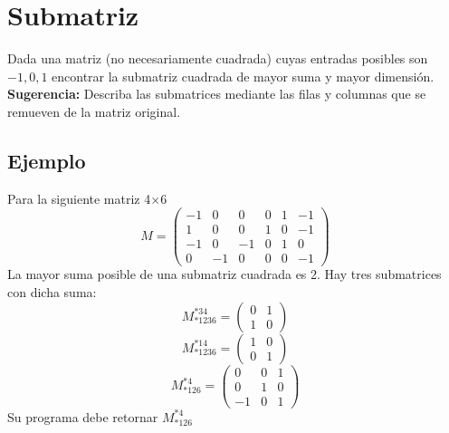 \section{Submatriz}
Dada una matriz (no necesariamente cuadrada) cuyas entradas posibles son $-1, 0, 1$
encontrar la submatriz cuadrada de mayor suma y mayor dimensión.
\textbf{Sugerencia:} Describa las submatrices mediante las filas y columnas que se
remueven de la matriz original.
\subsection*{Ejemplo}
Para la siguiente matriz 4$\times$6
\[
	M=
	\left(
		\begin{array}{rrrrrr}
			-1 & 0 & 0 & 0 & 1 & -1 \\
			1 & 0 & 0 & 1 & 0 & -1 \\
			-1 & 0 & -1 & 0 & 1 & 0 \\
			0 & -1 & 0 & 0 & 0 & -1
		\end{array}
	\right)
\]
La mayor suma posible de una submatriz cuadrada es 2. Hay tres submatrices con
dicha suma:
\[
	M^{*34}_{*1236}=
	\left(
		\begin{array}{rr}
			0 & 1\\
			1 & 0
		\end{array}
	\right)
\]
\[
	M^{*14}_{*1236}=
	\left(
		\begin{array}{rr}
			1 & 0\\
			0 & 1
		\end{array}
	\right)
\]
\[
	M^{*4}_{*126}=
	\left(
		\begin{array}{rrr}
			0 & 0 & 1\\
			0 & 1 & 0\\
			-1 & 0 & 1
		\end{array}
	\right)
\]
Su programa debe retornar \( M^{*4}_{*126}\)
